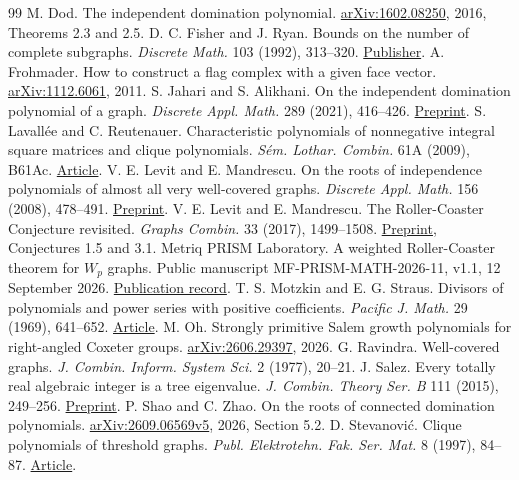 \documentclass[11pt,a4paper]{article}
\begin{document}
\begin{thebibliography}{99}
 M. Dod. The independent domination polynomial. \href{https://arxiv.org/abs/1602.08250}{arXiv:1602.08250}, 2016, Theorems 2.3 and 2.5.
 D. C. Fisher and J. Ryan. Bounds on the number of complete subgraphs. \emph{Discrete Math.} 103 (1992), 313--320. \href{https://doi.org/10.1016/0012-365X(92)90323-8}{Publisher}.
 A. Frohmader. How to construct a flag complex with a given face vector. \href{https://arxiv.org/abs/1112.6061}{arXiv:1112.6061}, 2011.
 S. Jahari and S. Alikhani. On the independent domination polynomial of a graph. \emph{Discrete Appl. Math.} 289 (2021), 416--426. \href{https://arxiv.org/abs/1808.07369}{Preprint}.
 S. Lavall\'ee and C. Reutenauer. Characteristic polynomials of nonnegative integral square matrices and clique polynomials. \emph{S\'em. Lothar. Combin.} 61A (2009), B61Ac. \href{https://www.mat.univie.ac.at/~slc/wpapers/s61Alavreu.pdf}{Article}.
 V. E. Levit and E. Mandrescu. On the roots of independence polynomials of almost all very well-covered graphs. \emph{Discrete Appl. Math.} 156 (2008), 478--491. \href{https://arxiv.org/abs/math/0305227}{Preprint}.
 V. E. Levit and E. Mandrescu. The Roller-Coaster Conjecture revisited. \emph{Graphs Combin.} 33 (2017), 1499--1508. \href{https://arxiv.org/abs/1612.03736}{Preprint}, Conjectures 1.5 and 3.1.
 Metriq PRISM Laboratory. A weighted Roller-Coaster theorem for $W_p$ graphs. Public manuscript MF-PRISM-MATH-2026-11, v1.1, 12 September 2026. \href{https://prism.metriq.org/papers/math-2026-11/}{Publication record}.
 T. S. Motzkin and E. G. Straus. Divisors of polynomials and power series with positive coefficients. \emph{Pacific J. Math.} 29 (1969), 641--652. \href{https://msp.org/pjm/1969/29-3/pjm-v29-n3-p13-p.pdf}{Article}.
 M. Oh. Strongly primitive Salem growth polynomials for right-angled Coxeter groups. \href{https://arxiv.org/abs/2606.29397}{arXiv:2606.29397}, 2026.
 G. Ravindra. Well-covered graphs. \emph{J. Combin. Inform. System Sci.} 2 (1977), 20--21.
 J. Salez. Every totally real algebraic integer is a tree eigenvalue. \emph{J. Combin. Theory Ser. B} 111 (2015), 249--256. \href{https://arxiv.org/abs/1302.4423}{Preprint}.
 P. Shao and C. Zhao. On the roots of connected domination polynomials. \href{https://arxiv.org/pdf/2609.06569v5}{arXiv:2609.06569v5}, 2026, Section 5.2.
 D. Stevanovi\'c. Clique polynomials of threshold graphs. \emph{Publ. Elektrotehn. Fak. Ser. Mat.} 8 (1997), 84--87. \href{https://draganstevanovic.wordpress.com/wp-content/uploads/2012/09/859.pdf}{Article}.

\end{thebibliography}
\end{document}
